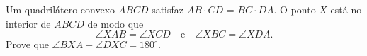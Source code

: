 Um quadrilátero convexo $ABCD$ satisfaz $AB \cdot CD$ = $BC \cdot DA$.
O ponto $X$ está no interior de $ABCD$ de modo que $$\angle XAB = \angle XCD \quad \mathrm{e} \quad \angle XBC = \angle XDA.$$
Prove que $\angle BXA + \angle DXC = 180^\circ$.
